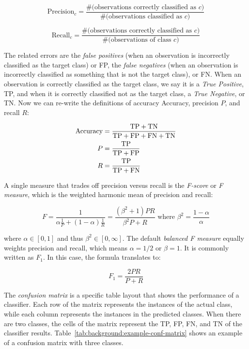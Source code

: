 \begin{equation}
    \text{Precision}_c = \frac{\text{\#(observations\ correctly\ classified\ as\ } c \text{)}}{ \text{\#(observations\ classified\ as\ } c \text{)} }
\end{equation}

\begin{equation}
    \text{Recall}_c = \frac{\text{\#(observations\ correctly\ classified\ as\ } c \text{)}}{ \text{\#(observations\ of\ class\ } c\text{)} } 
\end{equation}

The related errors are the {\em false positives} (when an observation is
incorrectly classified as the target class) or FP, the {\em false negatives}
(when an observation is incorrectly classified as something that is not the
target class), or FN. 
%
When an observation is correctly classified as the target class, we say it is a
{\em True Positive}, TP, and when it is correctly classified not as the target
class, a {\em True Negative}, or TN.
%
Now we can re-write the definitions of accuracy Accuracy, precision $P$, and recall
$R$:

\begin{align}
    \text{Accuracy} &= \frac{\text{TP} + \text{TN}}{\text{TP} + \text{FP} + \text{FN} + \text{TN}} \\
    P &= \frac{\text{TP}}{\text{TP} + \text{FP}} \\
    R &= \frac{\text{TP}}{\text{TP} + \text{FN}} 
\end{align}

A single measure that trades off precision versus recall is the {\em F-score} or
{\em F measure}, which is the weighted harmonic mean of precision and recall:

\begin{equation}
    F = \frac{1}{\alpha\frac{1}{P} + (1-\alpha)\frac{1}{R}} = \frac{(\beta^2+1)PR}{\beta^2P+R} \text{\ \ where\ \ } \beta^2 = \frac{1-\alpha}{\alpha}
\end{equation}

where $\alpha \in [0, 1]$ and thus $\beta^2 \in [0, \infty]$. 
%
The default {\em balanced F measure} equally weights precision and recall, which
means $\alpha=1/2$ or $\beta=1$.
%
It is commonly written as $F_1$.
%
In this case, the formula translates to:

\begin{equation}
    F_1 = \frac{2PR}{P+R}
\end{equation}


The {\em confusion matrix} is a specific table layout that shows the performance
of a classifier.
%
Each row of the matrix represents the instances of the actual class, while each
column represents the instances in the predicted classes.
%
When there are two classes, the cells of the matrix represent the TP, FP, FN,
and TN of the classifier results.
%
Table~\ref{tab:background:example-conf-matrix} shows an example of a confusion
matrix with three classes.

